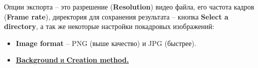 \documentclass[a4paper,12pt]{article}
\begin{document}
Опции экспорта -- это разрешение (\textbf{Resolution}) видео файла, его частота кадров (\textbf{Frame rate}), директория для сохранения результата -- кнопка \textbf{Select a directory}, а так же некоторые настройки покадровых изображений:

\begin{itemize}
	\item \textbf{Image format} -- PNG (выше качество) и JPG (быстрее).
	\item \href{https://wiki.freecad.org/Std_ViewScreenShot}{\textbf{Background} и \textbf{Creation method.}}
\end{itemize}
\end{document}
